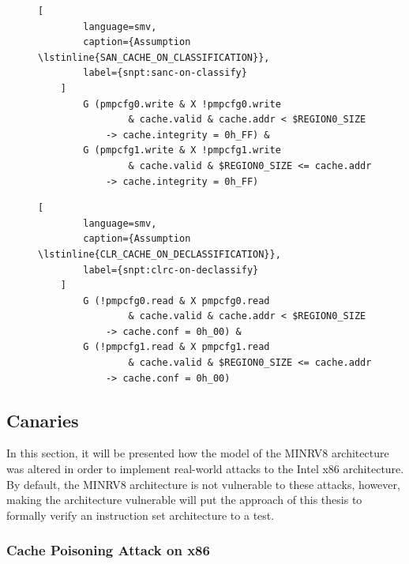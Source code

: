\begin{figure}
    \begin{lstlisting}[
        language=smv,
        caption={Assumption \lstinline{SAN_CACHE_ON_CLASSIFICATION}},
        label={snpt:sanc-on-classify}
    ]
        G (pmpcfg0.write & X !pmpcfg0.write
                & cache.valid & cache.addr < $REGION0_SIZE
            -> cache.integrity = 0h_FF) &
        G (pmpcfg1.write & X !pmpcfg1.write
                & cache.valid & $REGION0_SIZE <= cache.addr
            -> cache.integrity = 0h_FF)
    \end{lstlisting}

    \begin{lstlisting}[
        language=smv,
        caption={Assumption \lstinline{CLR_CACHE_ON_DECLASSIFICATION}},
        label={snpt:clrc-on-declassify}
    ]
        G (!pmpcfg0.read & X pmpcfg0.read
                & cache.valid & cache.addr < $REGION0_SIZE
            -> cache.conf = 0h_00) &
        G (!pmpcfg1.read & X pmpcfg1.read
                & cache.valid & $REGION0_SIZE <= cache.addr
            -> cache.conf = 0h_00)
    \end{lstlisting}
\end{figure}

\subsection{Canaries}
\label{sec:canaries}

In this section, it will be presented how the model of the MINRV8 architecture was altered in order to implement real-world attacks to the Intel x86 architecture.
By default, the MINRV8 architecture is not vulnerable to these attacks, however, making the architecture vulnerable will put the approach of this thesis to formally verify an instruction set architecture to a test.

\subsubsection{Cache Poisoning Attack on x86}

